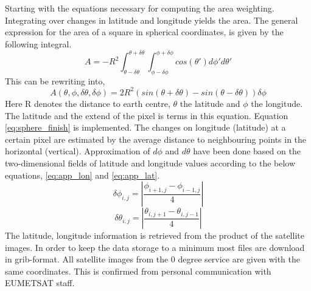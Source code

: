 \\ \\
Starting with the equations necessary for computing the area weighting. Integrating over changes in latitude and longitude yields the area. The general expression for the area of a square in spherical coordinates, is given by the following integral. 
\begin{equation} \label{eq:sphere_integral}
    A = -R^2\int_{ \theta - \delta \theta }^{\theta + \delta \theta} \int_{ \phi - \delta \phi }^{\phi + \delta \phi} cos\left( \theta' \right) d\phi' d\theta'
\end{equation}
This can be rewriting into,
\begin{equation} \label{eq:sphere_finish}
    A \left( \theta, \phi, \delta \theta, \delta \phi   \right)= 2R^2 \left( sin\left( \theta + \delta \theta  \right) - sin\left(  \theta - \delta \theta  \right) \right) \delta \phi
\end{equation}
Here R denotes the distance to earth centre, $\theta$ the latitude and $\phi$ the longitude. The latitude and the extend of the pixel is terms in this equation. Equation \ref{eq:sphere_finish} is implemented. The changes on longitude (latitude) at a certain pixel are estimated by the average distance to neighbouring points in the horizontal (vertical). Approximation of $d\phi$ and $d\theta$ have been done based on the two-dimensional fields of latitude and longitude values according to the below equations, \eqref{eq:app_lon} and  \eqref{eq:app_lat}.
\begin{equation} \label{eq:app_lon}
    \delta \phi_{i,j} = \left| \frac{\phi_{i+1,j} - \phi_{i-1, j}}{4} \right|
\end{equation}
\begin{equation} \label{eq:app_lat}
    \delta \theta_{i,j} = \left| \frac{\theta_{i,j+1} - \theta_{i, j-1}}{4} \right|
\end{equation}
The latitude, longitude information is retrieved from the product of the satellite images. In order to keep the data storage to a minimum most files are download in grib-format. All satellite images from the 0 degree service are given with the same coordinates. This is confirmed from personal communication with EUMETSAT staff.
\\ \\
